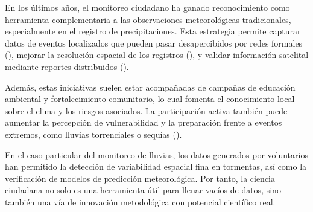 En los últimos años, el monitoreo ciudadano ha ganado reconocimiento como herramienta complementaria a las observaciones meteorológicas tradicionales, especialmente en el registro de precipitaciones. Esta estrategia permite capturar datos de eventos localizados que pueden pasar desapercibidos por redes formales  (\cite{viegas2023citizen}), mejorar la resolución espacial de los registros  (\cite{elmore2014mping}), y validar información satelital mediante reportes distribuidos  (\cite{lei2022combining}).

Además, estas iniciativas suelen estar acompañadas de campañas de educación ambiental y fortalecimiento comunitario, lo cual fomenta el conocimiento local sobre el clima y los riesgos asociados. La participación activa también puede aumentar la percepción de vulnerabilidad y la preparación frente a eventos extremos, como lluvias torrenciales o sequías  (\cite{okada2019community}).

En el caso particular del monitoreo de lluvias, los datos generados por voluntarios han permitido la detección de variabilidad espacial fina en tormentas, así como la verificación de modelos de predicción meteorológica. Por tanto, la ciencia ciudadana no solo es una herramienta útil para llenar vacíos de datos, sino también una vía de innovación metodológica con potencial científico real.

